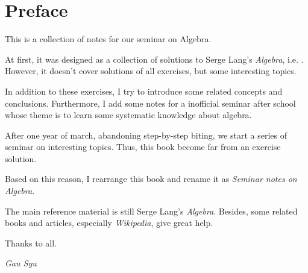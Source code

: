 \chapter*{\giant\Edward Preface}

This is a collection of notes for our seminar on Algebra.

At first, it was designed as a collection of solutions to Serge Lang's \emph{Algebra}, i.e. \cite{lang2002algebra}.
However, it doesn't cover solutions of all exercises, but some interesting topics.

In addition to these exercises, I try to introduce some related concepts and conclusions.
Furthermore, I add some notes for a inofficial seminar after school whose theme is to learn some systematic knowledge about algebra.

After one year of march, abandoning step-by-step biting, we start a series of seminar on interesting topics. Thus, this book become far from an exercise solution.

Based on this reason, I rearrange this book and rename it as \emph{Seminar notes on Algebra}.

The main reference material is still Serge Lang's \emph{Algebra}. Besides, some related books and articles, especially \emph{Wikipedia}, give great help.

Thanks to all.

\begin{flushright}
  \emph{Gau Syu}
\end{flushright}
